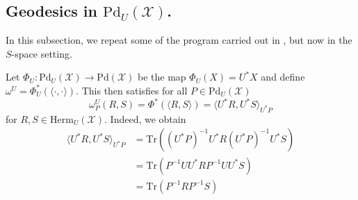 \documentclass{amsart}
\numberwithin{equation}{section}
\theoremstyle{definition}
\theoremstyle{plain}
\theoremstyle{solutionstyle}
\begin{document}
\subsection{Geodesics in \texorpdfstring{$\mathrm{Pd}_U(\mathcal{X})$}{PdU(X)}.}
In this subsection, we repeat some of the program carried out in \cite{franco2026conejhermitianmatricesgeometric}, but now in the $S$-space setting.

Let $\Phi_U:\mathrm{Pd}_U(\mathcal{X})\to \mathrm{Pd}(\mathcal{X})$ be the map $\Phi_U(X)=U^*X$ and define $\omega^U=\Phi^*_U(\langle\cdot,\cdot\rangle)$. This then satisfies for all $P\in \mathrm{Pd}_U(\mathcal{X})$
\begin{equation*}\omega^U_P(R,S)=\Phi^*(\langle R,S\rangle)=\langle U^*R,U^*S\rangle_{U^*P} \end{equation*} for $R,S \in \mathrm{Herm}_{U}(\mathcal{X})$. Indeed, we obtain
\begin{align*}
    \langle U^*R,U^*S\rangle_{U^*P}&=\mathrm{Tr}((U^*P)^{-1}U^*R(U^*P)^{-1}U^*S)\\
    &=\mathrm{Tr}(P^{-1}UU^*RP^{-1}UU^*S)\\
    &=\mathrm{Tr}(P^{-1}RP^{-1}S)
\end{align*}
\end{document}
